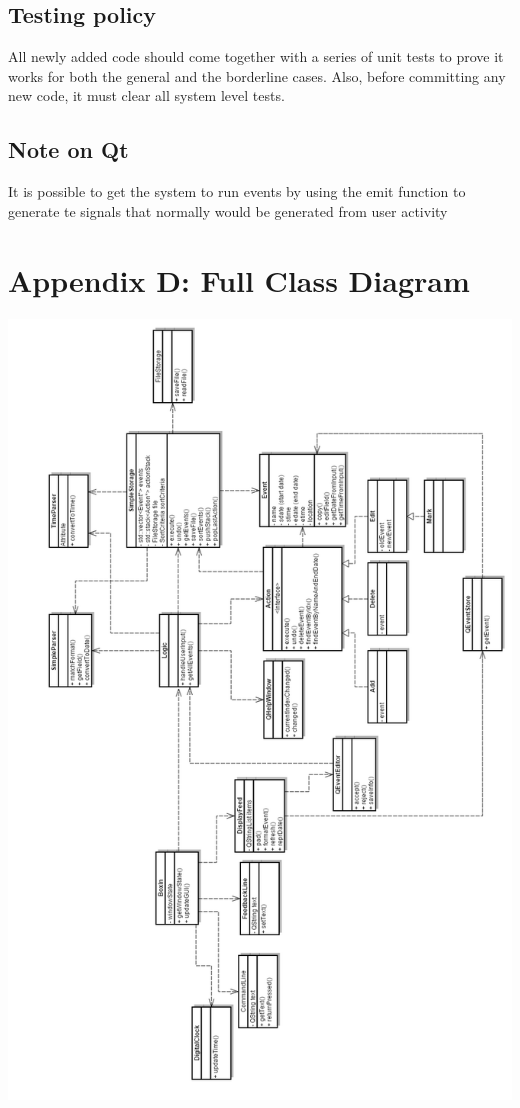 \documentclass[12pt]{extarticle}
\begin{document}
\subsection{Testing policy}
All newly added code should come together with a series of unit tests to prove it works for both the general and the borderline cases. Also, before committing any new code, it must clear all system level tests.

\subsection{Note on Qt}
It is possible to get the system to run events by using the emit function to generate te signals that normally would be generated from user activity


\section{Appendix D: Full Class Diagram}
\includegraphics[width=\textwidth, height=\textheight - 2cm]{class_diagram}
\end{document}
